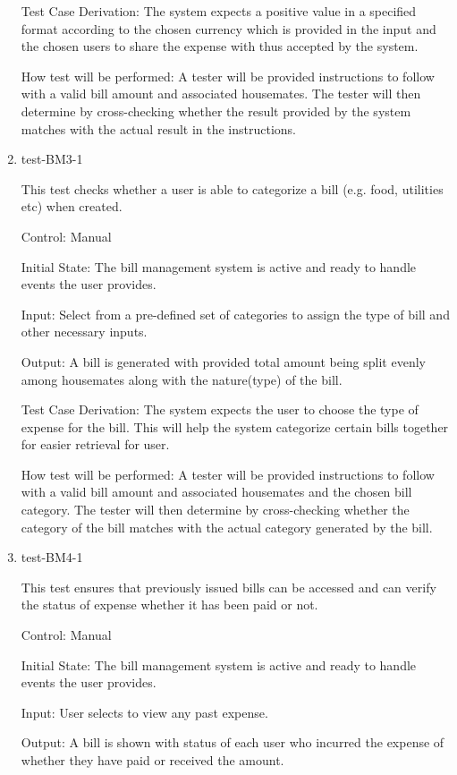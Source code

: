 \documentclass[12pt, titlepage]{article}
\begin{document}
\begin{enumerate}
Test Case Derivation: The system expects a positive value in a specified format according to the chosen currency which is provided in the input and the chosen users to share the expense with thus accepted by the system.

How test will be performed: A tester will be provided instructions to follow with a valid bill amount and associated housemates. The tester will then determine by cross-checking whether the result provided by the system matches with the actual result in the instructions. 

\item{test-BM3-1\\}

This test checks whether a user is able to categorize a bill (e.g. food, utilities etc) when created. 

Control: Manual
					
Initial State: The bill management system is active and ready to handle events the user provides.
					
Input: Select from a pre-defined set of categories to assign the type of bill and other necessary inputs.
					
Output: A bill is generated with provided total amount being split evenly among housemates along with the nature(type) of the bill.

Test Case Derivation: The system expects the user to choose the type of expense for the bill. This will help the system categorize certain bills together for easier retrieval for user.
					
How test will be performed: A tester will be provided instructions to follow with a valid bill amount and associated housemates and the chosen bill category. The tester will then determine by cross-checking whether the category of the bill matches with the actual category generated by the bill.

\item{test-BM4-1\\}

This test ensures that previously issued bills can be accessed and can verify the status of expense whether it has been paid or not.

Control: Manual
					
Initial State: The bill management system is active and ready to handle events the user provides.
					
Input: User selects to view any past expense. 
					
Output: A bill is shown with status of each user who incurred the expense of whether they have paid or received the amount.


\end{enumerate}
\end{document}
